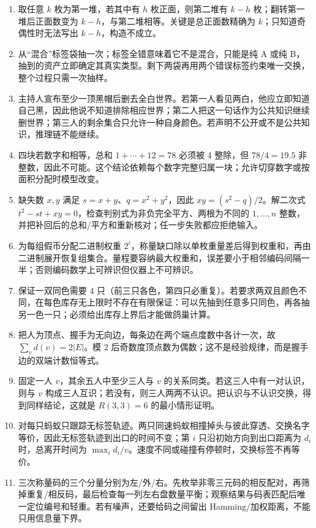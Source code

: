 \begin{enumerate}[leftmargin=*]
  \item 取任意 $k$ 枚为第一堆，若其中有 $h$ 枚正面，则第二堆有 $k-h$ 枚；翻转第一堆后正面数变为 $k-h$，与第二堆相等。关键是总正面数精确为 $k$；只知道奇偶性时无法写出 $k-h$，构造不成立。
  \item 从“混合”标签袋抽一次；标签全错意味着它不是混合，只能是纯 A 或纯 B，抽到的资产立即确定其真实类型。剩下两袋再用两个错误标签约束唯一交换，整个过程只需一次抽样。
  \item 主持人宣布至少一顶黑帽后删去全白世界。若第一人看见两白，他应立即知道自己黑，因此他说不知道排除相应世界；第二人把这一句话作为公共知识继续删世界；第三人的剩余集合只允许一种自身颜色。若声明不公开或不是公共知识，推理链不能继续。
  \item 四块若数字和相等，总和 $1+\cdots+12=78$ 必须被 4 整除，但 $78/4=19.5$ 非整数，因此不可能。这个结论依赖每个数字完整归属一块；允许切穿数字或按面积分配时模型改变。
  \item 缺失数 $x,y$ 满足 $s=x+y$、$q=x^2+y^2$，因此 $xy=(s^2-q)/2$。解二次式 $t^2-st+xy=0$，检查判别式为非负完全平方、两根为不同的 $1,\ldots,n$ 整数，并把补回后的总和/平方和重新核对；任一步失败都应拒绝输入。
  \item 为每组假币分配二进制权重 $2^i$，称量缺口除以单枚重量差后得到权重和，再由二进制展开恢复组集合。量程要容纳最大权重和，误差要小于相邻编码间隔一半；否则编码数学上可辨识但仪器上不可辨识。
  \item 保证一双同色需要 4 只（前三只各色，第四只必重复）。若要求两双且颜色不同，在每色库存无上限时不存在有限保证：可以先抽到任意多只同色，再各抽另一色一只；必须给出库存上界后才能做鸽巢计算。
  \item 把人为顶点、握手为无向边，每条边在两个端点度数中各计一次，故 $\sum_vd(v)=2|E|$。模 2 后奇数度顶点数为偶数；这不是经验规律，而是握手边的双端计数恒等式。
  \item 固定一人 $v$，其余五人中至少三人与 $v$ 的关系同类。若这三人中有一对认识，则与 $v$ 构成三人互识；若没有，则三人两两不认识。把认识与不认识交换，得到同样结论，这就是 $R(3,3)=6$ 的最小情形证明。
  \item 对每只蚂蚁只跟踪无标签轨迹。两只同速蚂蚁相撞掉头与彼此穿透、交换名字等价，因此无标签轨迹到出口的时间不变；第 $i$ 只沿初始方向到出口距离为 $d_i$ 时，总离开时间为 $\max_i d_i/v$。速度不同或碰撞有停顿时，交换标签不再等价。
  \item 三次称量码的三个分量分别为左/外/右。先枚举非零三元码的相反配对，再筛掉重复/相反码，最后检查每一列左右盘数量平衡；观察结果与码表匹配后唯一定位编号和轻重。若有噪声，还要给码之间留出 Hamming/加权距离，不能只用信息量下界。

\end{enumerate}
